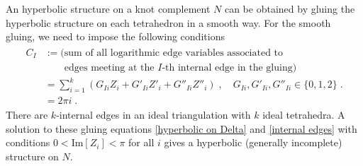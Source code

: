 \documentclass[a4paper,11pt]{article}
\begin{document}
An hyperbolic structure on a knot complement $N$ can be obtained  by gluing the hyperbolic structure on each tetrahedron in a smooth way. 
For the smooth gluing, we need to impose the following conditions
%
\begin{align}
\begin{split}
C_I  &:= (\textrm{sum of all logarithmic edge variables associated to }
\\
& \quad \quad  \textrm{edges meeting at the $I$-th internal edge in the gluing})  
\\
& =\sum_{i=1}^{k}(G_{Ii}Z_i +G'_{Ii}Z'_i +G''_{Ii}Z''_i)\;, \quad G_{Ii},G'_{Ii},G''_{Ii}\in \{ 0,1,2\}\;.
\\
& =2\pi i \;. \label{internal edges}
\end{split}
\end{align}
%
There are $k$-internal edges in an ideal triangulation with $k$ ideal tetrahedra. A solution to these gluing equations  \eqref{hyperbolic on Delta} and \eqref{internal edges} with conditions $0<\textrm{Im}[Z_i]<\pi$ for all $i$ gives a  hyperbolic  (generally  incomplete) structure on $N$. 
\end{document}
